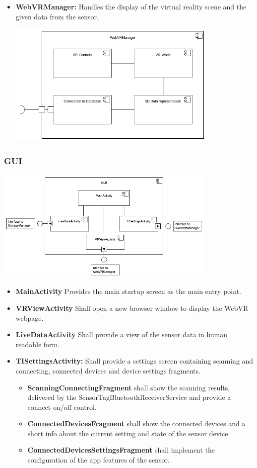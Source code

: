 \begin{itemize}
  \item \textbf{WebVRManager:} Handles the display of the virtual reality scene and the given data from the sensor.

 \includegraphics[width=0.8\textwidth]{pics/WebVRManager.png}

\end{itemize}

\subsubsection{GUI}

\includegraphics[width=0.8\textwidth]{pics/GUI.png}

\begin{itemize}
  \item \textbf{MainActivity} Provides the main startup screen as the main entry point.
  \item \textbf{VRViewActivity} Shall open a new browser window to display the WebVR webpage.
  \item \textbf{LiveDataActivity} Shall provide a view of the sensor data in human readable form.
  \item \textbf{TISettingsActivity:} Shall provide a settings screen containing scanning and connecting, connected devices and device settings fragments.
  \begin{itemize}
    \item \textbf{ScanningConnectingFragment} shall show the scanning results, delivered by the SensorTagBluetoothReceiverService and provide a connect on/off control.
    \item \textbf{ConnectedDevicesFragment} shall show the connected devices and a short info about the current setting and state of the sensor device.
    \item \textbf{ConnectedDevicesSettingsFragment} shall implement the configuration of the app features of the sensor.
  \end{itemize}
\end{itemize}

